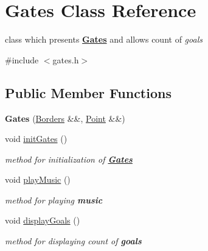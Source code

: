 \hypertarget{class_gates}{}\section{Gates Class Reference}
\label{class_gates}


class which presents {\bfseries{\mbox{\hyperlink{class_gates}{Gates}}}} and allows count of {\itshape goals}  




{\ttfamily \#include $<$gates.\+h$>$}

\subsection*{Public Member Functions}
\begin{DoxyCompactItemize}
\item 
\mbox{\label{class_gates_a0946de8e251820450ffd0eeb2987b0c5}} 
{\bfseries Gates} (\mbox{\hyperlink{class_borders}{Borders}} \&\&, \mbox{\hyperlink{class_point}{Point}} \&\&)
\item 
\mbox{\label{class_gates_a7fb05bd574d9c818a87789826f6ebd16}} 
void \mbox{\hyperlink{class_gates_a7fb05bd574d9c818a87789826f6ebd16}{init\+Gates}} ()
\begin{DoxyCompactList}\small\item\em {\itshape method} for initialization of {\bfseries{\mbox{\hyperlink{class_gates}{Gates}}}} \end{DoxyCompactList}\item 
\mbox{\label{class_gates_a79b2f2efc64efc61519a911629f74da3}} 
void \mbox{\hyperlink{class_gates_a79b2f2efc64efc61519a911629f74da3}{play\+Music}} ()
\begin{DoxyCompactList}\small\item\em {\itshape method} for playing {\bfseries{music}} \end{DoxyCompactList}\item 
\mbox{\label{class_gates_af891f15cfccf4848f9ec1c6273e810fb}} 
void \mbox{\hyperlink{class_gates_af891f15cfccf4848f9ec1c6273e810fb}{display\+Goals}} ()
\begin{DoxyCompactList}\small\item\em {\itshape method} for displaying {\itshape count} of {\bfseries{goals}} \end{DoxyCompactList}\item 

\end{DoxyCompactItemize}
